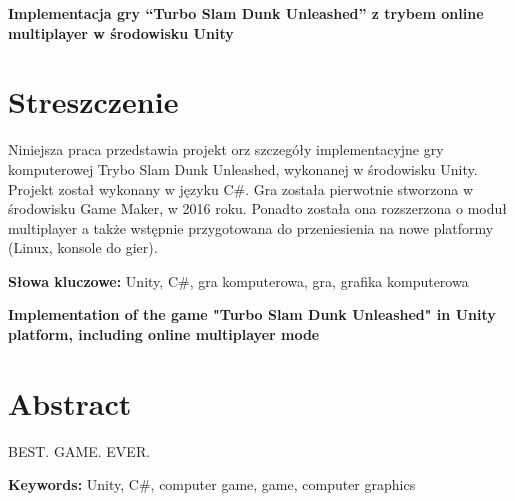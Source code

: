 \newpage
\begin{center}
\large \bf
Implementacja gry “Turbo Slam Dunk Unleashed” z trybem online multiplayer w środowisku Unity
\end{center}

\section*{Streszczenie}
Niniejsza praca przedstawia projekt  orz szczegóły implementacyjne gry komputerowej Trybo Slam Dunk Unleashed, wykonanej w środowisku Unity. Projekt został wykonany w języku C\#. Gra została pierwotnie stworzona w środowisku Game Maker, w 2016 roku. Ponadto została ona rozszerzona o moduł multiplayer a także wstępnie przygotowana do przeniesienia na nowe platformy (Linux, konsole do gier).

\bigskip
{\noindent\bf Słowa kluczowe:} Unity, C\#, gra komputerowa, gra, grafika komputerowa

\vskip 2cm


\begin{center}
\large \bf
Implementation of the game "Turbo Slam Dunk Unleashed" in Unity platform, including online multiplayer mode 
\end{center}

\section*{Abstract}
BEST. GAME. EVER.

\bigskip
{\noindent\bf Keywords:} Unity, C\#, computer game, game, computer graphics

\vfill